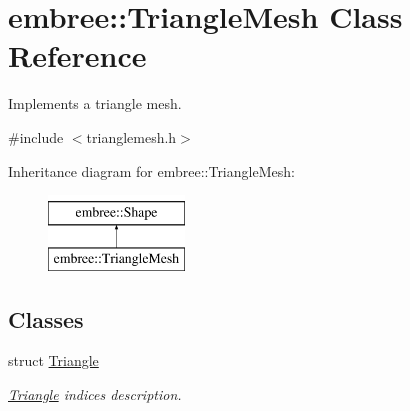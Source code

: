 \hypertarget{classembree_1_1_triangle_mesh}{
\section{embree::TriangleMesh Class Reference}
\label{classembree_1_1_triangle_mesh}
}


Implements a triangle mesh.  




{\ttfamily \#include $<$trianglemesh.h$>$}

Inheritance diagram for embree::TriangleMesh:\begin{figure}[H]
\begin{center}
\leavevmode
\includegraphics[height=2.000000cm]{classembree_1_1_triangle_mesh}
\end{center}
\end{figure}
\subsection*{Classes}
\begin{DoxyCompactItemize}
\item 
struct \hyperlink{structembree_1_1_triangle_mesh_1_1_triangle}{Triangle}
\begin{DoxyCompactList}\small\item\em \hyperlink{structembree_1_1_triangle_mesh_1_1_triangle}{Triangle} indices description. \item\end{DoxyCompactList}\end{DoxyCompactItemize}
